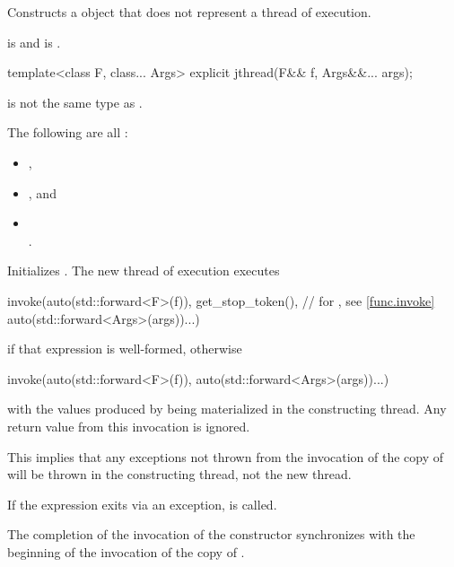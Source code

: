 \begin{itemdescr}
\pnum
\effects
Constructs a  object that does not represent
a thread of execution.

\pnum
\ensures
{} is 
and  is .
\end{itemdescr}

%
\begin{itemdecl}
template<class F, class... Args> explicit jthread(F&& f, Args&&... args);
\end{itemdecl}

\begin{itemdescr}
\pnum
\constraints
{} is not the same type as .

\pnum
\mandates
The following are all :
\begin{itemize}
\item {},
\item {}, and
\item {} \\ .
\end{itemize}

\pnum
\effects
Initializes .
The new thread of execution executes
\begin{codeblock}
invoke(auto(std::forward<F>(f)), get_stop_token(),  // for , see \ref{func.invoke}
       auto(std::forward<Args>(args))...)
\end{codeblock}
if that expression is well-formed,
otherwise
\begin{codeblock}
invoke(auto(std::forward<F>(f)), auto(std::forward<Args>(args))...)
\end{codeblock}
with the values produced by 
being materialized in the constructing thread.
Any return value from this invocation is ignored.
\begin{note}
This implies that any exceptions not thrown from the invocation of the copy
of  will be thrown in the constructing thread, not the new thread.
\end{note}
If the  expression exits via an exception,
 is called.

\pnum
\sync
The completion of the invocation of the constructor
synchronizes with the beginning of the invocation of the copy of .


\end{itemdescr}
